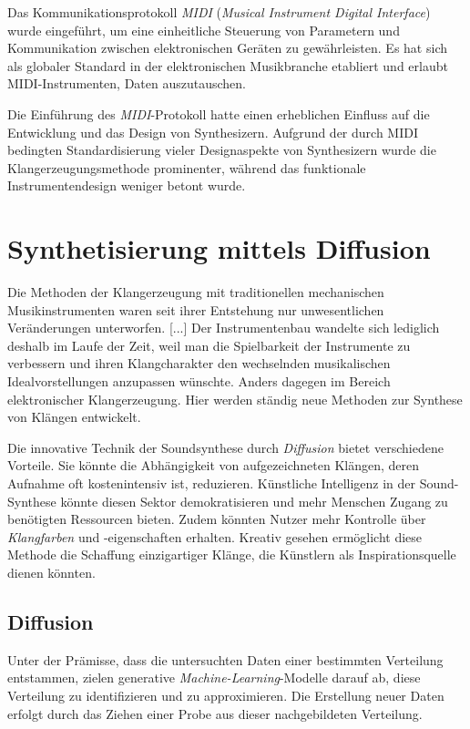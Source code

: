 \documentclass[
  a4paper,  %
  twoside,  %
  bibliography=totoc,
  headsepline,
  cleardoublepage=empty,
  parskip=half,
  draft=false
]{scrbook}
\begin{document}
Das Kommunikationsprotokoll \emph{MIDI} (\emph{Musical Instrument Digital Interface}) \cite{midi_association_midi_nodate} wurde eingeführt, um eine einheitliche Steuerung von Parametern und Kommunikation zwischen elektronischen Geräten zu gewährleisten. Es hat sich als globaler Standard in der elektronischen Musikbranche etabliert und erlaubt MIDI-Instrumenten, Daten auszutauschen. \cite{ruschkowski_elektronische_2019}

Die Einführung des \emph{MIDI}-Protokoll hatte einen erheblichen Einfluss auf die Entwicklung und das Design von Synthesizern. Aufgrund der durch MIDI bedingten Standardisierung vieler Designaspekte von Synthesizern wurde die Klangerzeugungsmethode prominenter, während das funktionale Instrumentendesign weniger betont wurde. \cite{russ_sound_2009}

\section{Synthetisierung mittels Diffusion}

\glqq Die Methoden der Klangerzeugung mit traditionellen mechanischen Musikinstrumenten waren seit ihrer Entstehung nur unwesentlichen Veränderungen unterworfen. [...] Der Instrumentenbau wandelte sich lediglich deshalb im Laufe der Zeit, weil man die Spielbarkeit der Instrumente zu verbessern und ihren Klangcharakter den wechselnden musikalischen Idealvorstellungen anzupassen wünschte. Anders dagegen im Bereich elektronischer Klangerzeugung. Hier werden ständig neue Methoden zur Synthese von Klängen entwickelt.\grqq \, \cite{ruschkowski_elektronische_2019}

Die innovative Technik der Soundsynthese durch \emph{Diffusion} bietet verschiedene Vorteile. Sie könnte die Abhängigkeit von aufgezeichneten Klängen, deren Aufnahme oft kostenintensiv ist, reduzieren. Künstliche Intelligenz in der Sound-Synthese könnte diesen Sektor demokratisieren und mehr Menschen Zugang zu benötigten Ressourcen bieten. Zudem könnten Nutzer mehr Kontrolle über \emph{Klangfarben} und -eigenschaften erhalten. Kreativ gesehen ermöglicht diese Methode die Schaffung einzigartiger Klänge, die Künstlern als Inspirationsquelle dienen könnten. \cite{haohe_liu_audioldm_2023}


\subsection{Diffusion}
Unter der Prämisse, dass die untersuchten Daten einer bestimmten Verteilung entstammen, zielen generative \emph{Machine-Learning}-Modelle darauf ab, diese Verteilung zu identifizieren und zu approximieren. Die Erstellung neuer Daten erfolgt durch das Ziehen einer Probe aus dieser nachgebildeten Verteilung. \cite{machine_learning_at_berkeley_diffusion_2022}
\end{document}
